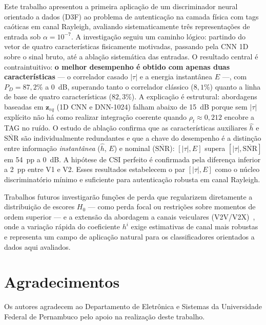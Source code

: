 \documentclass{sbrt}
\begin{document}
Este trabalho apresentou a primeira aplicação de um discriminador neural orientado a dados (D3F) ao problema de autenticação na camada física com tags caóticas em canal Rayleigh, avaliando sistematicamente três representações de entrada sob $\alpha = 10^{-7}$. A investigação seguiu um caminho lógico: partindo do vetor de quatro características fisicamente motivadas, passando pela CNN 1D sobre o sinal bruto, até a ablação sistemática das entradas. O resultado central é contraintuitivo: \textbf{o melhor desempenho é obtido com apenas duas características} — o correlador casado $|\tau|$ e a energia instantânea $E$ —, com $P_D = 87{,}2\%$ a 0~dB, superando tanto o correlador clássico ($8{,}1\%$) quanto a linha de base de quatro características ($82{,}3\%$). A explicação é estrutural: abordagens baseadas em $\mathbf{z}_{eq}$ (1D CNN e DNN-1024) falham abaixo de 15~dB porque sem $|\tau|$ explícito não há como realizar integração coerente quando $\rho_t \approx 0{,}212$ encobre a TAG no ruído. O estudo de ablação confirma que as características auxiliares $\hat{h}$ e $\overline{\text{SNR}}$ são individualmente redundantes e que a chave do desempenho é a distinção entre informação \emph{instantânea} ($\hat{h}$, $E$) e nominal ($\overline{\text{SNR}}$): $[|\tau|, E]$ supera $[|\tau|, \overline{\text{SNR}}]$ em 54~pp a 0~dB. A hipótese de CSI perfeito é confirmada pela diferença inferior a 2~pp entre V1 e V2. Esses resultados estabelecem o par $[|\tau|, E]$ como o núcleo discriminatório mínimo e suficiente para autenticação robusta em canal Rayleigh.

Trabalhos futuros investigarão funções de perda que regularizem diretamente a distribuição de escores $H_0$ — como perda focal ou restrições sobre momentos de ordem superior — e a extensão da abordagem a canais veiculares (V2V/V2X)~\cite{ref_3gpp}, onde a variação rápida do coeficiente $h^i$ exige estimativas de canal mais robustas e representa um campo de aplicação natural para os classificadores orientados a dados aqui avaliados.

\section*{Agradecimentos}
Os autores agradecem ao Departamento de Eletrônica e Sistemas da Universidade Federal de Pernambuco pelo apoio na realização deste trabalho.
\end{document}
